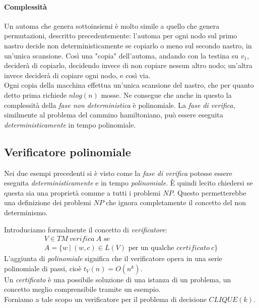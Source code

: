 \paragraph{Complessità}

Un automa che genera sottoinsiemi è molto simile a quello che genera permutazioni, descritto precedentemente: l'automa per ogni nodo sul primo nastro decide non deterministicamente se copiarlo o meno sul secondo nastro, in un'unica scansione. Così una "copia" dell'automa, andando con la testina su $v_1$, deciderà di copiarlo, decidendo invece di non copiare nessun altro nodo; un'altra invece deciderà di copiare ogni nodo, e così via.
\\

Ogni copia della macchina effettua un'unica scansione del nastro, che per quanto detto prima richiede $nlog(n)$ mosse. Ne consegue che anche in questo la complessità della \textit{fase non deterministica} è polinomiale. La \textit{fase di verifica}, similmente al problema del cammino hamiltoniano, può essere eseguita \textit{deterministicamente} in tempo polinomiale. 

\subsection{Verificatore polinomiale}

Nei due esempi precedenti si è visto come la \textit{fase di verifica} potesse essere eseguita \textit{deterministicamente} e in tempo \textit{polinomiale}. È quindi lecito chiedersi se questa sia una proprietà comune a tutti i problemi $NP$. Questo permetterebbe una definizione dei problemi $NP$ che ignora completamente il concetto del non determinismo. 

Introduciamo formalmente il concetto di \textit{verificatore}:
\begin{gather*}
	V \in TM \ verifica \ A \text{ se} \\
	A = \{ w \ | \ (w, c) \in L(V) \text{ per un qualche } certificato \ c \}
\end{gather*}
L'aggiunta di \textit{polinomiale} significa che il verificatore opera in una serie polinomiale di passi, cioè $t_V(n) = O(n^k)$.\\
Un \textit{certificato} è una possibile soluzione di una istanza di un problema, un concetto meglio comprensibile tramite un esempio. 
\\
Forniamo a tale scopo un verificatore per il problema di decisione $CLIQUE(k)$.
\\

